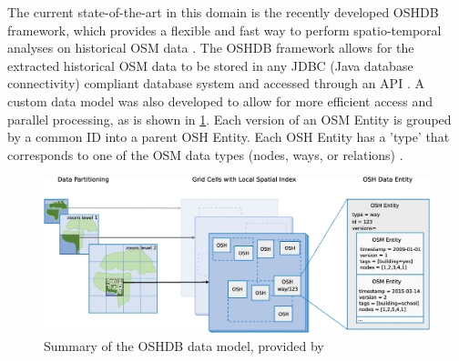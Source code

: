The current state-of-the-art in this domain is the recently developed OSHDB framework, which provides a flexible and fast way to perform spatio-temporal analyses on historical OSM data \parencite{raifer_oshdb_2019}. The OSHDB framework allows for the extracted historical OSM data to be stored in any JDBC (Java database connectivity) compliant database system and accessed through an API \parencite{raifer_oshdb_2019}. A custom data model was also developed to allow for more efficient access and parallel processing, as is shown in \ref{fig:oshdb}. Each version of an OSM Entity is grouped by a common ID into a parent OSH Entity. Each OSH Entity has a 'type' that corresponds to one of the OSM data types (nodes, ways, or relations) \parencite{raifer_oshdb_2019}. 

\begin{figure} %
    \centering %
    \includegraphics[width = \textwidth]{Images/oshdb.PNG} %
    \caption{Summary of the OSHDB data model, provided by \textcite{raifer_oshdb_2019}} %
    \label{fig:oshdb} %
\end{figure}




    


